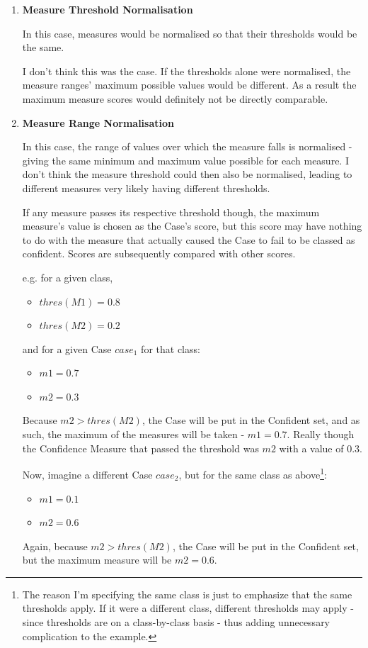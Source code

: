 \documentclass[a4paper,11pt]{report}
\begin{document}
\begin{enumerate}
	\item \textbf{Measure Threshold Normalisation}
	
	In this case, measures would be normalised so that their thresholds would be the same.
	
	I don't think this was the case. If the thresholds alone were normalised, the measure ranges' maximum possible values would be different. As a result the maximum measure scores would definitely not be directly comparable.
	
	\item \textbf{Measure Range Normalisation}
	
	In this case, the range of values over which the measure falls is normalised - giving the same minimum and maximum value possible for each measure. I don't think the measure threshold could then also be normalised, leading to different measures very likely having different thresholds. 
	
	If any measure passes its respective threshold though, the maximum measure's value is chosen as the Case's score, but this score may have nothing to do with the measure that actually caused the Case to fail to be classed as confident. Scores are subsequently compared with other scores.
	
	\begin{samepage}
	e.g. for a given class, 
	\begin{itemize}
		\item $thres(M1) = 0.8$
		\item $thres(M2) = 0.2$
	\end{itemize}
	and for a given Case $case_{1}$ for that class:
	\begin{itemize}
		\item $m1 = 0.7$
		\item $m2 = 0.3$
	\end{itemize}  
	\end{samepage}
	Because $m2 > thres(M2)$, the Case will be put in the Confident set, and as such, the maximum of the measures will be taken - $m1=0.7$. Really though the Confidence Measure that passed the threshold was $m2$ with a value of $0.3$.
	
	Now, imagine a different Case $case_{2}$, but for the same class as above\footnote{The reason I'm specifying the same class is just to emphasize that the same thresholds apply. If it were a different class, different thresholds may apply - since thresholds are on a class-by-class basis - thus adding unnecessary complication to the example.}:
	\begin{itemize}
		\item $m1 = 0.1$
		\item $m2 = 0.6$
	\end{itemize}
	Again, because $m2 > thres(M2)$, the Case will be put in the Confident set, but the maximum measure will be $m2 = 0.6$. 
	

\end{enumerate}
\end{document}
